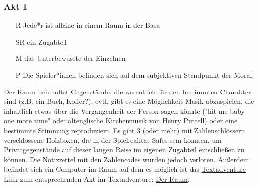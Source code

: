 \documentclass[a4paper, 12pt]{scrartcl}
\begin{document}
    \subsubsection{Akt 1}
   \begin{itemize}
   \item[R] Jede*r ist alleine in einem Raum in der Basa
   \item[SR] ein Zugabteil 
   \item[M] das Unterbewusste der Einzelnen
   \item[P] Die Spieler*innen befinden sich auf dem subjektiven Standpunkt der Moral. 
   \end{itemize}
   Der Raum beinhaltet Gegenstände, die wesentlich für den bestimmten Charakter sind (z.B. ein Buch, Koffer?), evtl. gibt es eine Möglichkeit Musik abzuspielen, die inhaltlich etwas über die Vergangenheit der Person sagen könnte ("hit me baby one more time" oder altenglische Kirchenmusik von Henry Purcell) oder eine bestimmte Stimmung reproduziert.
     Es gibt 3 (oder mehr) mit Zahlenschlössern verschlossene Holzboxen, die in der Spielrealität Safes sein könnten, um Privatgegenstände auf dieser langen Reise im eigenen Zugabteil einschließen zu können.
    Die Notizzettel mit den Zahlencodes wurden jedoch verloren.
    Außerdem befindet sich ein Computer im Raum auf dem es möglich ist das \hyperref[textadventure]{Textadventure} \\
    Link zum entsprechenden Akt im Textadventure: \hyperref[der-raum]{Der Raum}.
    
\end{document}
